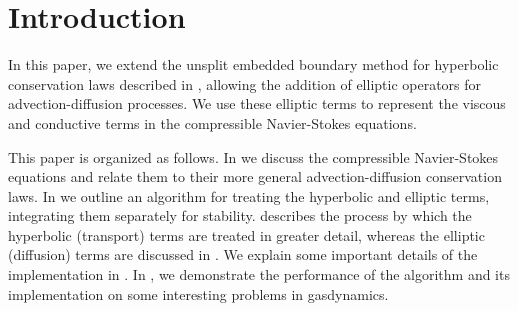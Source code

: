 \section{Introduction}

In this paper, we extend the unsplit embedded boundary method for hyperbolic 
conservation laws described in \cite{???}, allowing the addition of elliptic 
operators for advection-diffusion processes. We use these elliptic terms 
to represent the viscous and conductive terms in the compressible 
Navier-Stokes equations.

This paper is organized as follows. In  we discuss the 
compressible Navier-Stokes equations and relate them to their more general 
advection-diffusion conservation laws. In  we outline an 
algorithm for treating the hyperbolic and elliptic terms, integrating them 
separately for stability.  describes the process by which the 
hyperbolic (transport) terms are treated in greater detail, whereas the 
elliptic (diffusion) terms are discussed in . We explain 
some important details of the implementation in . In 
, we demonstrate the performance of the algorithm and its 
implementation on some interesting problems in gasdynamics.


